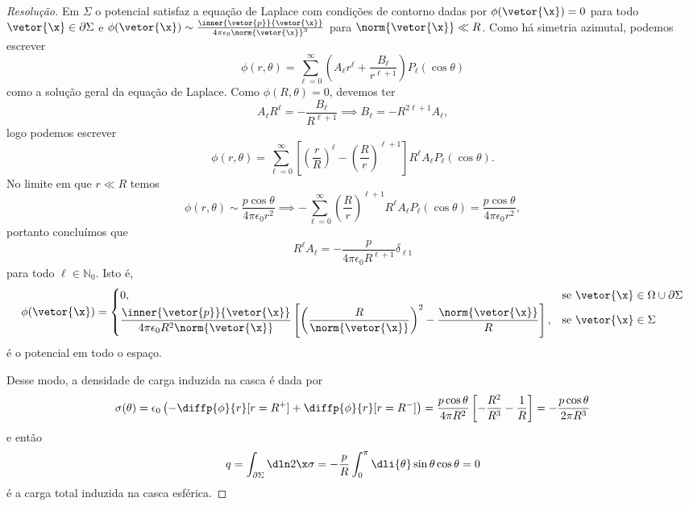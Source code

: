 \begin{proof}[Resolução]
    Em \(\Sigma\) o potencial satisfaz a equação de Laplace com condições de contorno dadas por \(\phi(\vetor{\x}) = 0\) para todo \(\vetor{\x} \in \partial \Sigma\) e \(\phi(\vetor{\x}) \sim \frac{\inner{\vetor{p}}{\vetor{\x}}}{4\pi \epsilon_0 \norm{\vetor{\x}}^3}\) para \(\norm{\vetor{\x}} \ll R\). Como há simetria azimutal, podemos escrever
    \begin{equation*}
        \phi(r,\theta) = \sum_{\ell = 0}^\infty \left(A_\ell r^\ell + \frac{B_{\ell}}{r^{\ell + 1}}\right) P_\ell(\cos\theta)
    \end{equation*}
    como a solução geral da equação de Laplace. Como \(\phi(R, \theta) = 0\), devemos ter
    \begin{equation*}
        A_\ell R^\ell = - \frac{B_{\ell}}{R^{\ell + 1}} \implies B_{\ell} = -R^{2\ell + 1} A_{\ell},
    \end{equation*}
    logo podemos escrever
    \begin{equation*}
        \phi(r, \theta) = \sum_{\ell = 0}^\infty \left[\left(\frac{r}{R}\right)^{\ell} - \left(\frac{R}{r}\right)^{\ell + 1}\right] R^\ell A_\ell P_{\ell}(\cos\theta).
    \end{equation*}
    No limite em que \(r \ll R\) temos
    \begin{equation*}
        \phi(r, \theta) \sim \frac{p \cos\theta}{4\pi \epsilon_0 r^2} \implies -\sum_{\ell = 0}^\infty \left(\frac{R}{r}\right)^{\ell + 1}R^\ell A_\ell P_{\ell}(\cos\theta) = \frac{p \cos\theta}{4\pi \epsilon_0 r^2},
    \end{equation*}
    portanto concluímos que
    \begin{equation*}
        R^\ell A_\ell = -\frac{p}{4\pi \epsilon_0 R^{\ell + 1}}\delta_{\ell 1}
    \end{equation*}
    para todo \(\ell \in \mathbb{N}_0\). Isto é,
    \begin{equation*}
        \phi(\vetor{\x}) = \begin{cases}
            0,&\text{se } \vetor{\x} \in \Omega \cup \partial \Sigma\\
            \displaystyle \frac{\inner{\vetor{p}}{\vetor{\x}}}{4\pi \epsilon_0 R^2 \norm{\vetor{\x}}}\left[\left(\frac{R}{\norm{\vetor{\x}}}\right)^2 - \frac{\norm{\vetor{\x}}}{R}\right],&\text{se }\vetor{\x} \in \Sigma
        \end{cases}
    \end{equation*}
    é o potencial em todo o espaço.

    Desse modo, a densidade de carga induzida na casca é dada por
    \begin{equation*}
        \sigma(\theta) = \epsilon_0\left(-\diffp{\phi}{r}[r = R^+] + \diffp{\phi}{r}[r = R^-]\right) = \frac{p\cos\theta}{4\pi R^2} \left[-\frac{R^2}{R^3} - \frac{1}{R}\right] = -\frac{p \cos\theta}{2\pi R^3}
    \end{equation*}
    e então
    \begin{equation*}
        q = \int_{\partial \Sigma} \dln2{\x} \sigma = -\frac{p}{R}\int_0^\pi \dli{\theta} \sin\theta \cos\theta = 0
    \end{equation*}
    é a carga total induzida na casca esférica.

\end{proof}
